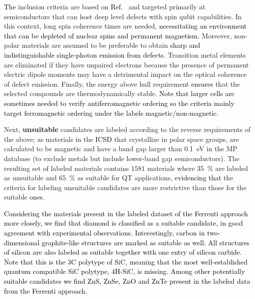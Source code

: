 \documentclass[superscriptaddress,unsortedaddress,
 amsmath,amssymb,
 aps,
]{revtex4-2}
\newcommand{\mrk}[1]{\textcolor{black}{#1}}
\begin{document}
\mrk{The} inclusion criteria are based on \mrk{Ref.}~\cite{Weber2010} and targeted primarily at semiconductors that can host deep level defects with spin qubit capabilities. In this context, long spin coherence times are needed, \mrk{necessitating an environment that can be depleted of nuclear spins and permanent magnetism.} 
Moreover, non-polar materials are assumed to be preferable to obtain \mrk{sharp and indistinguishable single-photon emission from defects}.  
Transition metal elements are eliminated if they have unpaired electrons because the presence of permanent electric dipole moments may have a detrimental impact on the optical coherence of defect emission. 
Finally, the energy above hull requirement \mrk{ensures} that the selected compounds are thermodynamically stable.
\mrk{Note that larger cells are sometimes needed to verify antiferromagnetic ordering so the criteria mainly target ferromagnetic ordering under the labels magnetic/non-magnetic.}

Next, \textbf{unsuitable} candidates are labeled according to the reverse requirements of the above; as materials in the \mrk{ICSD} that crystallize in polar space groups, are calculated to be magnetic and have a band gap larger than \SI{0.1}{\electronvolt} in the MP database (to exclude metals but include lower-band gap semiconductors). 
The resulting set of labeled materials contains $1581$ materials where \SI{35}{\percent}
are labeled as unsuitable and \SI{65}{\percent} 
as suitable for QT applications, \mrk{evidencing that} 
the criteria for labeling unsuitable candidates are more restrictive than those for the suitable \mrk{ones}.


\mrk{Considering the materials present in the labeled dataset of the Ferrenti approach more closely, we find that diamond is classified as a suitable candidate, in good agreement with experimental observations. Interestingly, carbon in two-dimensional graphite-like structures are marked as suitable as well. All structures of silicon are also labeled as suitable together with one entry of silicon carbide. Note that this is the $3$C polytype of SiC, meaning that the most well-established quantum compatible SiC polytype, $4$H-SiC, is missing. 
Among other potentially suitable candidates we find ZnS, ZnSe, ZnO and ZnTe present in the labeled data from the Ferrenti approach.} 
\end{document}
